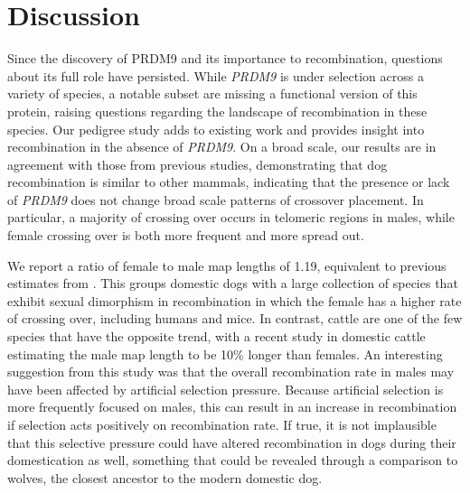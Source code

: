 \section{Discussion}

Since the discovery of PRDM9 and its importance to recombination, questions about its full role have persisted.
While \textit{PRDM9} is under selection across a variety of species\cite{Oliver2009}, a notable subset are missing a functional version of this protein, raising questions regarding the landscape of recombination in these species.
Our pedigree study adds to existing work and provides insight into recombination in the absence of \textit{PRDM9}.
On a broad scale, our results are in agreement with those from previous studies, demonstrating that dog recombination is similar to other mammals, indicating that the presence or lack of \textit{PRDM9} does not change broad scale patterns of crossover placement.
In particular, a majority of crossing over occurs in telomeric regions in males, while female crossing over is both more frequent and more spread out.

We report a ratio of female to male map lengths of 1.19, equivalent to previous estimates from \citet{Wong2010}.
This groups domestic dogs with a large collection of species that exhibit sexual dimorphism in recombination in which the female has a higher rate of crossing over, including humans\cite{Campbell2015} and mice\cite{Cox2009}.
In contrast, cattle are one of the few species that have the opposite trend, with a recent study in domestic cattle estimating the male map length to be 10\% longer than females\cite{Ma2015}.
An interesting suggestion from this study was that the overall recombination rate in males may have been affected by artificial selection pressure.
Because artificial selection is more frequently focused on males, this can result in an increase in recombination if selection acts positively on recombination rate.
If true, it is not implausible that this selective pressure could have altered recombination in dogs during their domestication as well, something that could be revealed through a comparison to wolves, the closest ancestor to the modern domestic dog.
 
